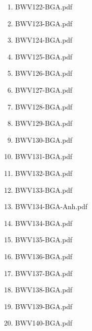 \documentclass[11pt]{article}
\begin{document}
\begin{enumerate}
\begin{enumerate}
\begin{enumerate}
\item BWV122-BGA.pdf
\label{sec-1-1-1-1-44-6-7-1-142}

\item BWV123-BGA.pdf
\label{sec-1-1-1-1-44-6-7-1-143}

\item BWV124-BGA.pdf
\label{sec-1-1-1-1-44-6-7-1-144}

\item BWV125-BGA.pdf
\label{sec-1-1-1-1-44-6-7-1-145}

\item BWV126-BGA.pdf
\label{sec-1-1-1-1-44-6-7-1-146}

\item BWV127-BGA.pdf
\label{sec-1-1-1-1-44-6-7-1-147}

\item BWV128-BGA.pdf
\label{sec-1-1-1-1-44-6-7-1-148}

\item BWV129-BGA.pdf
\label{sec-1-1-1-1-44-6-7-1-149}

\item BWV130-BGA.pdf
\label{sec-1-1-1-1-44-6-7-1-150}

\item BWV131-BGA.pdf
\label{sec-1-1-1-1-44-6-7-1-151}

\item BWV132-BGA.pdf
\label{sec-1-1-1-1-44-6-7-1-152}

\item BWV133-BGA.pdf
\label{sec-1-1-1-1-44-6-7-1-153}

\item BWV134-BGA-Anh.pdf
\label{sec-1-1-1-1-44-6-7-1-154}

\item BWV134-BGA.pdf
\label{sec-1-1-1-1-44-6-7-1-155}

\item BWV135-BGA.pdf
\label{sec-1-1-1-1-44-6-7-1-156}

\item BWV136-BGA.pdf
\label{sec-1-1-1-1-44-6-7-1-157}

\item BWV137-BGA.pdf
\label{sec-1-1-1-1-44-6-7-1-158}

\item BWV138-BGA.pdf
\label{sec-1-1-1-1-44-6-7-1-159}

\item BWV139-BGA.pdf
\label{sec-1-1-1-1-44-6-7-1-160}

\item BWV140-BGA.pdf
\label{sec-1-1-1-1-44-6-7-1-161}


\end{enumerate}
\end{enumerate}
\end{enumerate}
\end{document}
